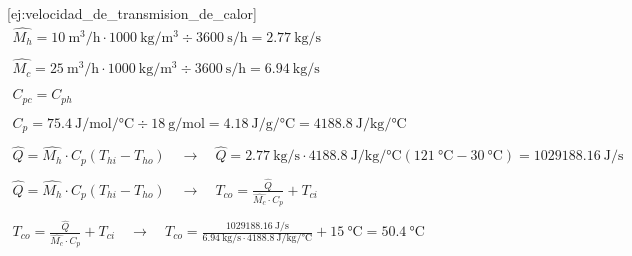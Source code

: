 [ej:velocidad_de_transmision_de_calor]{
    \begin{gather*}
        \hat{M_{h}} = \qty{10}{\m\cubed\per\hour} \cdot \qty{1000}{\kg\per\m\cubed} \div \qty{3600}{\s\per\hour} = \qty{2.77}{\kg\per\s}
        \\\\
        \hat{M_{c}} = \qty{25}{\m\cubed\per\hour} \cdot \qty{1000}{\kg\per\m\cubed} \div \qty{3600}{\s\per\hour} = \qty{6.94}{\kg\per\s}
        \\\\
        C_{pc} = C_{ph}
        \\\\
        C_{p} = \qty{75.4}{\J\per\mole\per\degreeCelsius} \div \qty{18}{\g\per\mole} = \qty{4.18}{\J\per\g\per\degreeCelsius} = \qty{4188.8}{\J\per\kg\per\degreeCelsius}
        \\\\
        \hat{Q} = \hat{M_{h}} \cdot C_{p} (T_{hi} - T_{ho}) \quad\longrightarrow\quad \hat{Q} = \qty{2.77}{\kg\per\s} \cdot \qty{4188.8}{\J\per\kg\per\degreeCelsius} (\qty{121}{\degreeCelsius} - \qty{30}{\degreeCelsius}) = \qty{1029188.16}{\J\per\s}
        \\\\
        \hat{Q} = \hat{M_{h}} \cdot C_{p} (T_{hi} - T_{ho}) \quad\longrightarrow\quad T_{co} = \frac{\hat{Q}}{\hat{M_{c}} \cdot C_{p}} + T_{ci}
        \\\\
        T_{co} = \frac{\hat{Q}}{\hat{M_{c}} \cdot C_{p}} + T_{ci} \quad\longrightarrow\quad T_{co} = \frac{\qty{1029188.16}{\J\per\s}}{\qty{6.94}{\kg\per\s} \cdot \qty{4188.8}{\J\per\kg\per\degreeCelsius}} + \qty{15}{\degreeCelsius} = \qty{50.4}{\degreeCelsius}
    \end{gather*}
}

